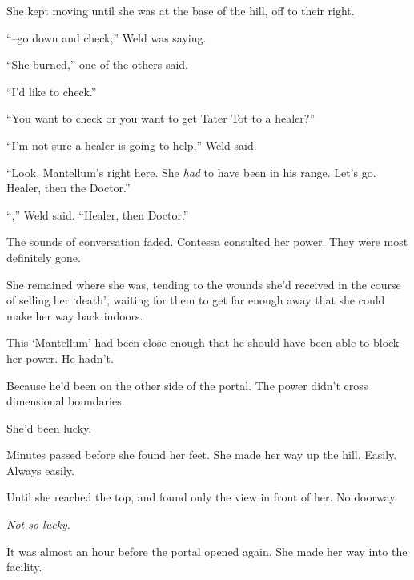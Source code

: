 She kept moving until she was at the base of the hill, off to their right.



``--go down and check,'' Weld was saying.



``She burned,'' one of the others said.



``I'd like to check.''



``You want to check or you want to get Tater Tot to a healer?''



``I'm not sure a healer is going to help,'' Weld said.



``Look.  Mantellum's right here.  She \emph{had} to have been in his range.  Let's go.  Healer, then the Doctor.''



``\ldotsRight,'' Weld said.  ``Healer, then Doctor.''



The sounds of conversation faded.  Contessa consulted her power.  They were most definitely gone.



She remained where she was, tending to the wounds she'd received in the course of selling her `death', waiting for them to get far enough away that she could make her way back indoors.



This `Mantellum' had been close enough that he should have been able to block her power.  He hadn't.



Because he'd been on the other side of the portal.  The power didn't cross dimensional boundaries.



She'd been lucky.



Minutes passed before she found her feet.  She made her way up the hill.  Easily.  Always easily.



Until she reached the top, and found only the view in front of her.  No doorway.



\emph{Not so lucky}.



\sectionbreak



It was almost an hour before the portal opened again.  She made her way into the facility.



